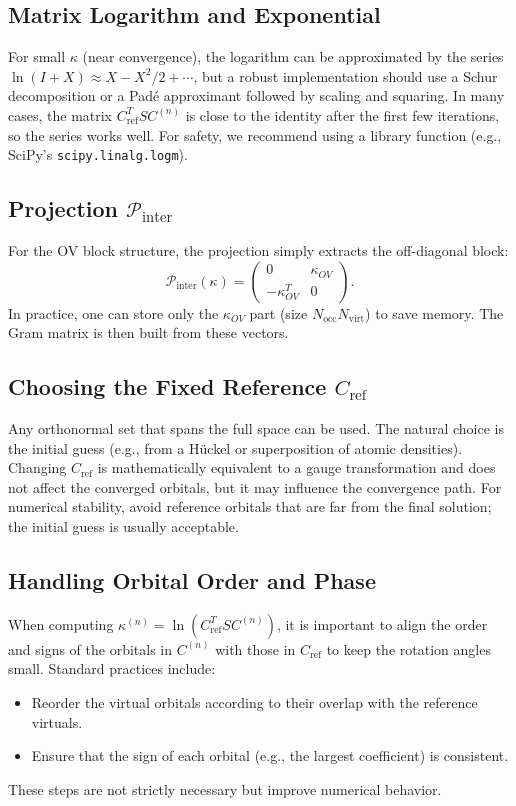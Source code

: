 \documentclass[12pt,a4paper]{article}
\begin{document}
\subsection{Matrix Logarithm and Exponential}
For small $\kappa$ (near convergence), the logarithm can be approximated by the series $\ln(I+X) \approx X - X^2/2 + \cdots$, but a robust implementation should use a Schur decomposition or a Padé approximant followed by scaling and squaring. In many cases, the matrix $C_{\text{ref}}^T S C^{(n)}$ is close to the identity after the first few iterations, so the series works well. For safety, we recommend using a library function (e.g., SciPy's \texttt{scipy.linalg.logm}).

\subsection{Projection $\mathcal{P}_{\text{inter}}$}
For the OV block structure, the projection simply extracts the off-diagonal block:
\[
\mathcal{P}_{\text{inter}}(\kappa) = \begin{pmatrix} 0 & \kappa_{OV} \\ -\kappa_{OV}^T & 0 \end{pmatrix}.
\]
In practice, one can store only the $\kappa_{OV}$ part (size $N_{\text{occ}}N_{\text{virt}}$) to save memory. The Gram matrix is then built from these vectors.

\subsection{Choosing the Fixed Reference $C_{\text{ref}}$}
Any orthonormal set that spans the full space can be used. The natural choice is the initial guess (e.g., from a Hückel or superposition of atomic densities). Changing $C_{\text{ref}}$ is mathematically equivalent to a gauge transformation and does not affect the converged orbitals, but it may influence the convergence path. For numerical stability, avoid reference orbitals that are far from the final solution; the initial guess is usually acceptable.

\subsection{Handling Orbital Order and Phase}
When computing $\kappa^{(n)} = \ln(C_{\text{ref}}^T S C^{(n)})$, it is important to align the order and signs of the orbitals in $C^{(n)}$ with those in $C_{\text{ref}}$ to keep the rotation angles small. Standard practices include:
\begin{itemize}
\item Reorder the virtual orbitals according to their overlap with the reference virtuals.
\item Ensure that the sign of each orbital (e.g., the largest coefficient) is consistent.
\end{itemize}
These steps are not strictly necessary but improve numerical behavior.
\end{document}

